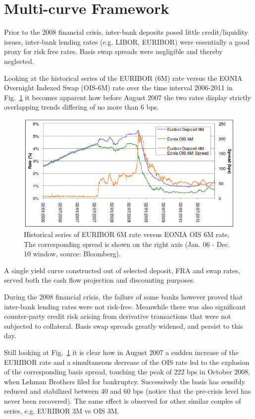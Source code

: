 \section{Multi-curve Framework}
\label{sec:financial-crisis}


Prior to the 2008 financial crisis, inter-bank deposits posed little credit/liquidity issues, inter-bank lending rates (e.g. LIBOR, EURIBOR) were essentially a good proxy for risk free rates. Basis swap spreads were negligible and thereby neglected. 

Looking at the historical series of the EURIBOR (6M) rate versus the EONIA Overnight Indexed Swap (OIS-6M) rate over the time interval 2006-2011 in Fig.~\ref{fig:credit_crunch} it becomes apparent how before August 2007 the two rates display strictly overlapping trends differing of no more than 6 bps.

\begin{figure}[htb]
	\centering
	\includegraphics[width=0.9\linewidth]{figures/credit_crunch.png}
	\caption{Historical series of EURIBOR 6M rate versus EONIA OIS 6M rate. The corresponding spread 
		is shown on the right axis (Jan. 06 - Dec. 10 window, source: Bloomberg).}
	\label{fig:credit_crunch}
\end{figure}

A single yield curve constructed out of selected deposit, FRA and swap rates, served both the cash flow projection and discounting purposes.

During the 2008 financial crisis, the failure of some banks however proved that inter-bank lending rates were not risk-free. Meanwhile there was also significant counter-party credit risk arising from derivative transactions that were not subjected to collateral. Basis swap spreads greatly widened, and persist to this day. 

Still looking at Fig.~\ref{fig:credit_crunch} it is clear how in August 2007 a sudden increase of the EURIBOR rate and a simultaneous decrease of the OIS rate led to the explosion of the corresponding basis spread, touching the peak of 222 bps in October 2008, when Lehman Brothers filed for bankruptcy. Successively the basis has sensibly reduced and stabilized between 40 and 60 bps (notice that the pre-crisis level has never been recovered). The same effect is observed for other similar couples of series, e.g. EURIBOR 3M vs OIS 3M.

